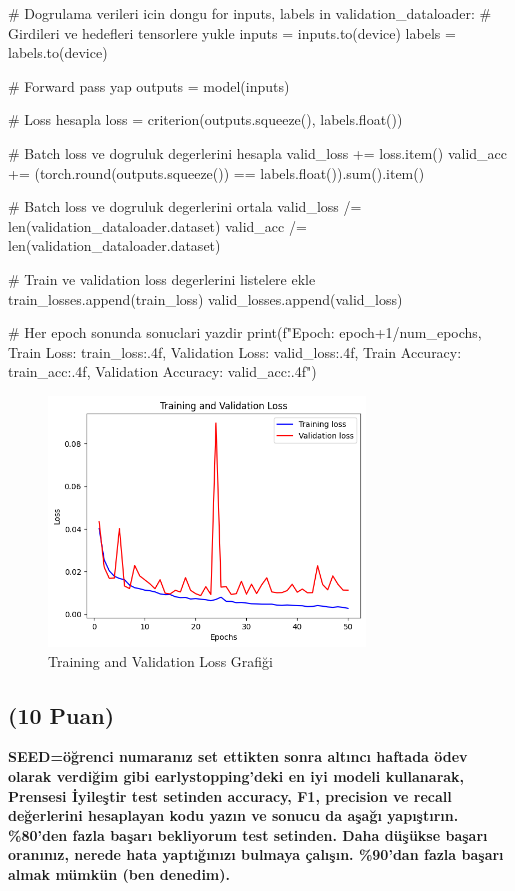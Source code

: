 \documentclass[11pt]{article}
\begin{document}
\begin{python}
    # Dogrulama verileri icin dongu
    for inputs, labels in validation_dataloader:
        # Girdileri ve hedefleri tensorlere yukle
        inputs = inputs.to(device)
        labels = labels.to(device)

        # Forward pass yap
        outputs = model(inputs)

        # Loss hesapla
        loss = criterion(outputs.squeeze(), labels.float())

        # Batch loss ve dogruluk degerlerini hesapla
        valid_loss += loss.item()
        valid_acc += (torch.round(outputs.squeeze()) == labels.float()).sum().item()

    # Batch loss ve dogruluk degerlerini ortala
    valid_loss /= len(validation_dataloader.dataset)
    valid_acc /= len(validation_dataloader.dataset)


    # Train ve validation loss degerlerini listelere ekle
    train_losses.append(train_loss)
    valid_losses.append(valid_loss)

    # Her epoch sonunda sonuclari yazdir
    print(f"Epoch: {epoch+1}/{num_epochs}, Train Loss: {train_loss:.4f}, Validation Loss: {valid_loss:.4f}, Train Accuracy: {train_acc:.4f}, Validation Accuracy: {valid_acc:.4f}")
    

\end{python}


\begin{figure}[ht!]
    \centering
    \includegraphics[width=0.75\textwidth]{indir.png}
    \caption{Training and Validation Loss Grafiği}
    \label{fig:my_pic}
\end{figure}


\subsection{(10 Puan)} \textbf{SEED=öğrenci numaranız set ettikten sonra altıncı haftada ödev olarak verdiğim gibi earlystopping'deki en iyi modeli kullanarak, Prensesi İyileştir test setinden accuracy, F1, precision ve recall değerlerini hesaplayan kodu yazın ve sonucu da aşağı yapıştırın. \%80'den fazla başarı bekliyorum test setinden. Daha düşükse başarı oranınız, nerede hata yaptığınızı bulmaya çalışın. \%90'dan fazla başarı almak mümkün (ben denedim).}
\end{document}
